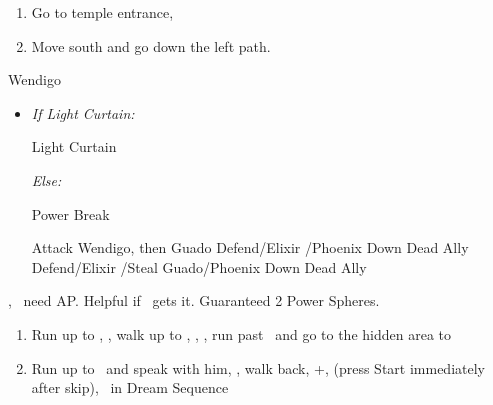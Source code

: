 \begin{enumerate}[resume]
	\item Go to temple entrance, \sd
	\item Move south and go down the left path.
\end{enumerate}
\begin{battle}[18000]{Wendigo}
	\begin{itemize}
		\tidusf Haste \tidus
		\tidusf Switch Weapon to Brotherhood
		\tidusf Attack Guado B (Top One)
		\item \textit{If Light Curtain:}
		      \begin{itemize}
			      \rikkuf Light Curtain \tidus
		      \end{itemize}
		      \textit{Else:}
		      \begin{itemize}
			      \switch{\rikku}{\auron}
			      \auronf Power Break
		      \end{itemize}
		      \tidusf Attack Wendigo, then Guado
		      \yunaf Defend/Elixir \tidus/Phoenix Down Dead Ally
		      \rikkuf Defend/Elixir \tidus/Steal Guado/Phoenix Down Dead Ally
		      \switch{\yuna}{\lulu}
	\end{itemize}
	\yuna, \tidus\ need AP. Helpful if \lulu\ gets it.
	Guaranteed 2 Power Spheres.
\end{battle}
\begin{enumerate}[resume]
	\item Run up to \rikku, \sd, walk up to \yuna, \sd, \save, run past \kimahri\ and go to the hidden area to 
	\item Run up to \auron\ and speak with him, \sd, walk back, \cs+\skippablefmv[1:00], (press Start immediately after skip), \sd\ in Dream Sequence
\end{enumerate}
\newpage